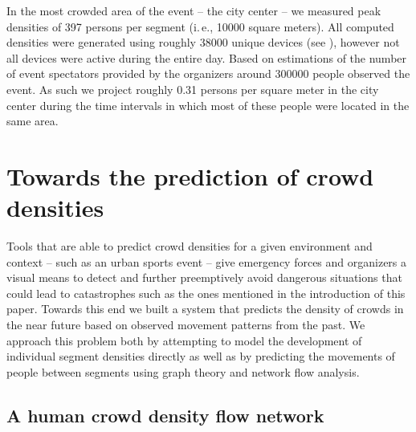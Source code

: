 \documentclass[12pt,a4paper,twoside,openright]{book}
\begin{document}
In the most crowded area of the event -- the city center -- we measured peak densities of 397 persons per segment (i.\,e., 10000 square meters).
%
All computed densities were generated using roughly 38000 unique devices (see ), however not all devices were active during the entire day.
%
Based on estimations of the number of event spectators provided by the organizers around 300000 people observed the event.
%
As such we project roughly 0.31 persons per square meter in the city center during the time intervals in which most of these people were located in the same area.

\section{Towards the prediction of crowd densities}
\label{sec:predicting}

Tools that are able to predict crowd densities for a given environment and context -- such as an urban sports event -- give emergency forces and organizers a visual means to detect and further preemptively avoid dangerous situations that could lead to catastrophes \cite{Johansson2012} such as the ones mentioned in the introduction of this paper.
%
Towards this end we built a system that predicts the density of crowds in the near future based on observed movement patterns from the past.
%
We approach this problem both by attempting to model the development of individual segment densities directly as well as by predicting the movements of people between segments using graph theory and network flow analysis.

\subsection{A human crowd density flow network}
\label{subsec:human-density-flow-network}
\end{document}
